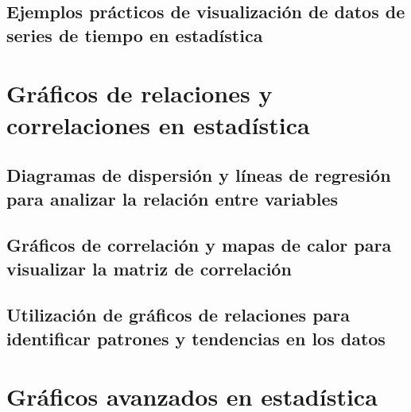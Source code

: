 \documentclass[
  a4paper,
]{article}
\begin{document}
\hypertarget{ejemplos-pruxe1cticos-de-visualizaciuxf3n-de-datos-de-series-de-tiempo-en-estaduxedstica}{%
\subsection{Ejemplos prácticos de visualización de datos de series de
tiempo en
estadística}\label{ejemplos-pruxe1cticos-de-visualizaciuxf3n-de-datos-de-series-de-tiempo-en-estaduxedstica}}

\hypertarget{gruxe1ficos-de-relaciones-y-correlaciones-en-estaduxedstica}{%
\section{Gráficos de relaciones y correlaciones en
estadística}\label{gruxe1ficos-de-relaciones-y-correlaciones-en-estaduxedstica}}

\hypertarget{diagramas-de-dispersiuxf3n-y-luxedneas-de-regresiuxf3n-para-analizar-la-relaciuxf3n-entre-variables}{%
\subsection{Diagramas de dispersión y líneas de regresión para analizar
la relación entre
variables}\label{diagramas-de-dispersiuxf3n-y-luxedneas-de-regresiuxf3n-para-analizar-la-relaciuxf3n-entre-variables}}

\hypertarget{gruxe1ficos-de-correlaciuxf3n-y-mapas-de-calor-para-visualizar-la-matriz-de-correlaciuxf3n}{%
\subsection{Gráficos de correlación y mapas de calor para visualizar la
matriz de
correlación}\label{gruxe1ficos-de-correlaciuxf3n-y-mapas-de-calor-para-visualizar-la-matriz-de-correlaciuxf3n}}

\hypertarget{utilizaciuxf3n-de-gruxe1ficos-de-relaciones-para-identificar-patrones-y-tendencias-en-los-datos}{%
\subsection{Utilización de gráficos de relaciones para identificar
patrones y tendencias en los
datos}\label{utilizaciuxf3n-de-gruxe1ficos-de-relaciones-para-identificar-patrones-y-tendencias-en-los-datos}}

\hypertarget{gruxe1ficos-avanzados-en-estaduxedstica}{%
\section{Gráficos avanzados en
estadística}\label{gruxe1ficos-avanzados-en-estaduxedstica}}
\end{document}
